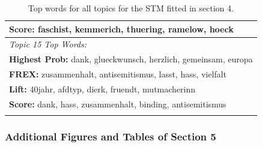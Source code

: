 \begin{center}
\begin{longtable}{|l|}
 	 \textbf{Score:} faschist, kemmerich, thuering, ramelow, hoeck \\
\hline
\textit{Topic 15 Top Words:}\\
 	 \textbf{Highest Prob:} dank, glueckwunsch, herzlich, gemeinsam, europa \\
 	 \textbf{FREX:} zusammenhalt, antisemitismus, lasst, hass, vielfalt \\
 	 \textbf{Lift:} 40jahr, afdtyp, dierk, fruendt, mutmacherinn \\
 	 \textbf{Score:} dank, hass, zusammenhalt, binding, antisemitismus \\
\hline
\caption{Top words for all topics for the STM fitted in section 4.}
\label{tab:top_words_complete} 
\end{longtable}
\end{center}

\subsubsection*{Additional Figures and Tables of Section 5}

